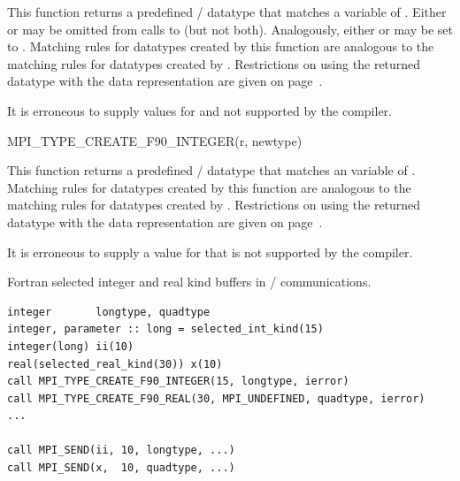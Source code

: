 This function returns a predefined \MPI/ datatype that matches a  variable
of  .
Either  or  may be omitted from calls to
\gb{} (but not both).  Analogously, either
 or  may be set to .
Matching rules for datatypes created by this function are
analogous to the matching rules for datatypes created by
.
Restrictions on using the returned datatype with the 
data
representation are given on page~\pageref{f90:kind:external32}.

It is erroneous to supply values for  and  not
supported by the compiler.


\begin{funcdef}{MPI\_TYPE\_CREATE\_F90\_INTEGER}{(\mbox{r}, \mbox{newtype})}
\end{funcdef}

This function returns a predefined \MPI/ datatype that matches an  variable
of  .
Matching rules for datatypes created by this function are
analogous to the matching rules for datatypes created by
.
Restrictions on using the returned datatype with the 
data
representation are given on page~\pageref{f90:kind:external32}.

It is erroneous to supply a value for  that is not
supported by the compiler.

\begin{example}
Fortran selected integer and real kind buffers in \MPI/ communications.
\label{exa:lang:selected:kind}
%
\begin{lstlisting}[language={[MPI]Fortran}]
integer       longtype, quadtype
integer, parameter :: long = selected_int_kind(15)
integer(long) ii(10)
real(selected_real_kind(30)) x(10)
call MPI_TYPE_CREATE_F90_INTEGER(15, longtype, ierror)
call MPI_TYPE_CREATE_F90_REAL(30, MPI_UNDEFINED, quadtype, ierror)
...

call MPI_SEND(ii, 10, longtype, ...)
call MPI_SEND(x,  10, quadtype, ...)
\end{lstlisting}
\end{example}

